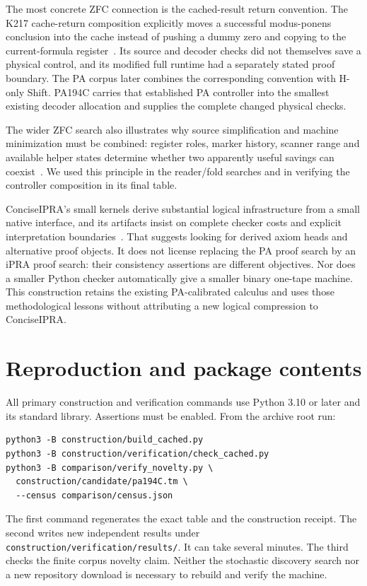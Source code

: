 \documentclass[11pt,letterpaper]{article}
\newcommand{\file}[1]{\texttt{\nolinkurl{#1}}}
\begin{document}
The most concrete ZFC connection is the cached-result return convention.
The K217 cache-return composition explicitly moves a successful
modus-ponens conclusion into the cache instead of pushing a dummy zero
and copying to the current-formula register~\cite{zfc-cache}. Its source
and decoder checks did not themselves save a physical control, and its
modified full runtime had a separately stated proof boundary. The PA
corpus later combines the corresponding convention with H-only Shift.
PA194C carries that established PA controller into the smallest existing
decoder allocation and supplies the complete changed physical checks.

The wider ZFC search also illustrates why source simplification and
machine minimization must be combined: register roles, marker history,
scanner range and available helper states determine whether two
apparently useful savings can coexist~\cite{zfc-readme}. We used this
principle in the reader/fold searches and in verifying the controller
composition in its final table.

ConciseIPRA's small kernels derive substantial logical infrastructure
from a small native interface, and its artifacts insist on complete
checker costs and explicit interpretation boundaries~\cite{concise}.
That suggests looking for derived axiom heads and alternative proof
objects. It does not license replacing the PA proof search by an iPRA
proof search: their consistency assertions are different objectives.
Nor does a smaller Python checker automatically give a smaller binary
one-tape machine. This construction retains the existing PA-calibrated
calculus and uses those methodological lessons without attributing a
new logical compression to ConciseIPRA.

\section{Reproduction and package contents}

All primary construction and verification commands use Python 3.10 or
later and its standard library. Assertions must be enabled. From the
archive root run:
\begin{verbatim}
python3 -B construction/build_cached.py
python3 -B construction/verification/check_cached.py
python3 -B comparison/verify_novelty.py \
  construction/candidate/pa194C.tm \
  --census comparison/census.json
\end{verbatim}
The first command regenerates the exact table and the construction
receipt. The second writes new independent results under
\file{construction/verification/results/}. It can take several minutes.
The third checks the finite corpus novelty claim. Neither the stochastic
discovery search nor a new repository download is necessary to rebuild
and verify the machine.
\end{document}
